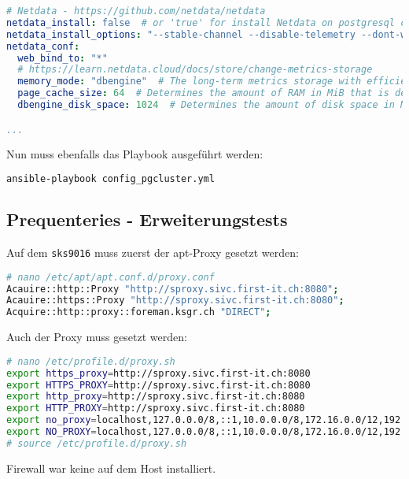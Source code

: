 \begin{flushleft}
\begin{lstlisting}[language=yaml, caption=Testsystem - Anhang - Maintenance - main.yml,captionpos=b,label={lst:testsystem-maintenance-main.yml},breaklines=true]
# Netdata - https://github.com/netdata/netdata
netdata_install: false  # or 'true' for install Netdata on postgresql cluster nodes (with kickstart.sh)
netdata_install_options: "--stable-channel --disable-telemetry --dont-wait"
netdata_conf:
  web_bind_to: "*"
  # https://learn.netdata.cloud/docs/store/change-metrics-storage
  memory_mode: "dbengine"  # The long-term metrics storage with efficient RAM and disk usage.
  page_cache_size: 64  # Determines the amount of RAM in MiB that is dedicated to caching Netdata metric values.
  dbengine_disk_space: 1024  # Determines the amount of disk space in MiB that is dedicated to storing Netdata metric values.

...

    \end{lstlisting}
    Nun muss ebenfalls das Playbook ausgeführt werden:
    \lstset{style=gra_codestyle}
    \begin{lstlisting}[language=bash, caption=Testsystem - Anhang - Maintenance - config\_pgcluster.yml,captionpos=b,label={lst:config-appendix-pgcluster},breaklines=true]
ansible-playbook config_pgcluster.yml
    \end{lstlisting}
    \subsection{Prequenteries - Erweiterungstests}
    Auf dem \texttt{sks9016} muss zuerst der apt-Proxy gesetzt werden:
    \lstset{style=gra_codestyle}
    \begin{lstlisting}[language=bash, caption=Testsystem - sks9016 - apt-Proxy Settings,captionpos=b,label={lst:testsystem-installation-sks9016-apt-proxy-settings},breaklines=true]
# nano /etc/apt/apt.conf.d/proxy.conf
Acauire::http::Proxy "http://sproxy.sivc.first-it.ch:8080";
Acauire::https::Proxy "http://sproxy.sivc.first-it.ch:8080";
Acquire::http::proxy::foreman.ksgr.ch "DIRECT";
    \end{lstlisting}
    Auch der Proxy muss gesetzt werden:
    \lstset{style=gra_codestyle}
    \begin{lstlisting}[language=bash, caption=Testsystem - sks9016 - Proxy Settings,captionpos=b,label={lst:testsystem-installation-sks9016-proxy-settings},breaklines=true]
# nano /etc/profile.d/proxy.sh
export https_proxy=http://sproxy.sivc.first-it.ch:8080
export HTTPS_PROXY=http://sproxy.sivc.first-it.ch:8080
export http_proxy=http://sproxy.sivc.first-it.ch:8080
export HTTP_PROXY=http://sproxy.sivc.first-it.ch:8080
export no_proxy=localhost,127.0.0.0/8,::1,10.0.0.0/8,172.16.0.0/12,192.168.0.0/16
export NO_PROXY=localhost,127.0.0.0/8,::1,10.0.0.0/8,172.16.0.0/12,192.168.0.0/16
# source /etc/profile.d/proxy.sh
    \end{lstlisting}
    Firewall war keine auf dem Host installiert.

\end{flushleft}
